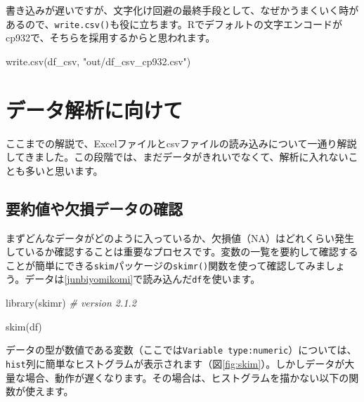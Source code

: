 \documentclass[
  xelatex,ja=standard, b5paper]{bxjsbook}
\newenvironment{Shaded}{\begin{snugshade}}{\end{snugshade}}
\newcommand{\CommentTok}[1]{\textcolor[rgb]{0.56,0.35,0.01}{\textit{#1}}}
\newcommand{\FunctionTok}[1]{\textcolor[rgb]{0.00,0.00,0.00}{#1}}
\newcommand{\NormalTok}[1]{#1}
\newcommand{\StringTok}[1]{\textcolor[rgb]{0.31,0.60,0.02}{#1}}
\begin{document}
書き込みが遅いですが、文字化け回避の最終手段として、なぜかうまくいく時があるので、\texttt{write.csv()}も役に立ちます。Rでデフォルトの文字エンコードがcp932で、そちらを採用するからと思われます。

\begin{Shaded}
\begin{Highlighting}[]
\FunctionTok{write.csv}\NormalTok{(df\_csv, }\StringTok{"out/df\_csv\_cp932.csv"}\NormalTok{)}
\end{Highlighting}
\end{Shaded}

\hypertarget{dataanal}{%
\chapter{データ解析に向けて}\label{dataanal}}

ここまでの解説で、Excelファイルとcsvファイルの読み込みについて一通り解説してきました。この段階では、まだデータがきれいでなくて、解析に入れないことも多いと思います。

\hypertarget{ux8981ux7d04ux5024ux3084ux6b20ux640dux30c7ux30fcux30bfux306eux78baux8a8d}{%
\section{要約値や欠損データの確認}\label{ux8981ux7d04ux5024ux3084ux6b20ux640dux30c7ux30fcux30bfux306eux78baux8a8d}}

まずどんなデータがどのように入っているか、欠損値（NA）はどれくらい発生しているか確認することは重要なプロセスです。変数の一覧を要約して確認することが簡単にできる\texttt{skim}パッケージの\texttt{skimr()}関数を使って確認してみましょう。データは\ref{junbiyomikomi}で読み込んだ\texttt{df}を使います。

\begin{Shaded}
\begin{Highlighting}[]
\FunctionTok{library}\NormalTok{(skimr) }\CommentTok{\# version 2.1.2}
\end{Highlighting}
\end{Shaded}

\begin{Shaded}
\begin{Highlighting}[]
\FunctionTok{skim}\NormalTok{(df)}
\end{Highlighting}
\end{Shaded}



データの型が数値である変数（ここでは\texttt{Variable\ type:numeric}）については、\texttt{hist}列に簡単なヒストグラムが表示されます（図\ref{fig:skim}）。しかしデータが大量な場合、動作が遅くなります。その場合は、ヒストグラムを描かない以下の関数が使えます。
\end{document}
